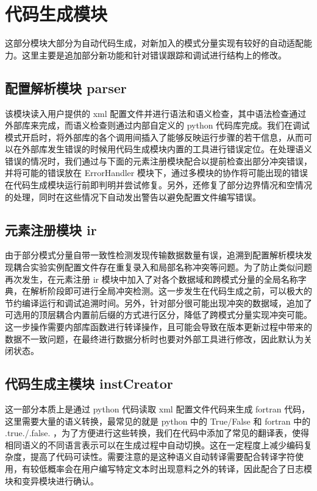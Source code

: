 \section{代码生成模块}

这部分模块大部分为自动代码生成，对新加入的模式分量实现有较好的自动适配能力。这里主要是追加部分新功能和针对错误跟踪和调试进行结构上的修改。

\subsection{配置解析模块 parser}

该模块读入用户提供的 xml 配置文件并进行语法和语义检查，其中语法检查通过外部库来完成，而语义检查则通过内部自定义的 python 代码库完成。我们在调试模式开启时，将外部库的各个调用间插入了能够反映运行步骤的若干信息，从而可以在外部库发生错误的时候用代码生成模块内置的工具进行错误定位。在处理语义错误的情况时，我们通过与下面的元素注册模块配合以提前检查出部分冲突错误，并将可能的错误放在 ErrorHandler 模块下，通过多模块的协作将可能出现的错误在代码生成模块运行前即判明并尝试修复。另外，还修复了部分边界情况和空情况的处理，同时在这些情况下自动发出警告以避免配置文件编写错误。

\subsection{元素注册模块 ir}

由于部分模式分量自带一致性检测发现传输数据数量有误，追溯到配置解析模块发现耦合实验实例配置文件存在重复录入和局部名称冲突等问题。为了防止类似问题再次发生，在元素注册 ir 模块中加入了对各个数据域和跨模式分量的全局名称字典，在解析阶段即可进行全局冲突检测。这一步发生在代码生成之前，可以极大的节约编译运行和调试追溯时间。另外，针对部分很可能出现冲突的数据域，追加了可选用的顶层耦合内置前后缀的方式进行区分，降低了跨模式分量实现冲突可能。这一步操作需要内部库函数进行转译操作，且可能会导致在版本更新过程中带来的数据不一致问题，在最终进行数据分析时也要对外部工具进行修改，因此默认为关闭状态。

\subsection{代码生成主模块 instCreator}

这一部分本质上是通过 python 代码读取 xml 配置文件代码来生成 fortran 代码，这里需要大量的语义转换，最常见的就是 python 中的 True/False 和 fortran 中的 .true./.false. ，为了方便进行这些转换，我们在代码中添加了常见的翻译表，使得相同语义的不同语言表示可以在生成过程中自动切换。这在一定程度上减少编码复杂度，提高了代码可读性。需要注意的是这种语义自动转译需要配合转译字符使用，有较低概率会在用户编写特定文本时出现意料之外的转译，因此配合了日志模块和变异模块进行确认。

